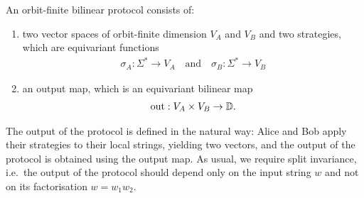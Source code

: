 \begin{definition}
    \label{def:orbit-finite-scalar-product-protocol}
    An orbit-finite bilinear protocol consists of:
    \begin{enumerate}
        \item two vector spaces of orbit-finite dimension $V_A$ and $V_B$ and two strategies, which are equivariant functions
        \begin{align*}
        \sigma_A : \Sigma^* \to V_A 
        \quad \text{and} \quad
        \sigma_B : \Sigma^* \to V_B
        \end{align*}
        \item an output map, which is an equivariant bilinear map 
        \begin{align*}
        \text{out} : V_A \times V_B \to \mathbb D.
        \end{align*}
    \end{enumerate}
\end{definition}
The output of the protocol is defined in the natural way: Alice and Bob apply their strategies to their local strings, yielding two vectors, and the output of the protocol is obtained using the output map. As usual, we require split invariance, i.e.~the output of the protocol should depend only on the input string $w$ and not on its factorisation $w = w_1 w_2$.


